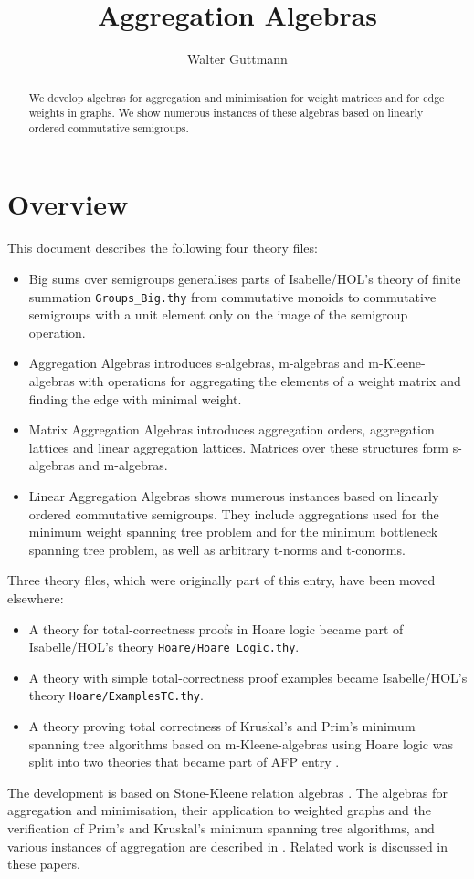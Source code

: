 \documentclass[11pt,a4paper]{article}
\begin{document}
\title{Aggregation Algebras}
\author{Walter Guttmann}
\maketitle

\begin{abstract}
  We develop algebras for aggregation and minimisation for weight matrices and for edge weights in graphs.
  We show numerous instances of these algebras based on linearly ordered commutative semigroups.
\end{abstract}

\tableofcontents

\section{Overview}

This document describes the following four theory files:
\begin{itemize}
\item Big sums over semigroups generalises parts of Isabelle/HOL's theory of finite summation \texttt{Groups\_Big.thy} from commutative monoids to commutative semigroups with a unit element only on the image of the semigroup operation.
\item Aggregation Algebras introduces s-algebras, m-algebras and m-Kleene-algebras with operations for aggregating the elements of a weight matrix and finding the edge with minimal weight.
\item Matrix Aggregation Algebras introduces aggregation orders, aggregation lattices and linear aggregation lattices.
      Matrices over these structures form s-algebras and m-algebras.
\item Linear Aggregation Algebras shows numerous instances based on linearly ordered commutative semigroups.
      They include aggregations used for the minimum weight spanning tree problem and for the minimum bottleneck spanning tree problem, as well as arbitrary t-norms and t-conorms.
\end{itemize}
Three theory files, which were originally part of this entry, have been moved elsewhere:
\begin{itemize}
\item A theory for total-correctness proofs in Hoare logic became part of Isabelle/HOL's theory \texttt{Hoare/Hoare\_Logic.thy}.
\item A theory with simple total-correctness proof examples became Isabelle/HOL's theory \texttt{Hoare/ExamplesTC.thy}.
\item A theory proving total correctness of Kruskal's and Prim's minimum spanning tree algorithms based on m-Kleene-algebras using Hoare logic was split into two theories that became part of AFP entry \cite{GuttmannRobinsonOBrien2020}.
\end{itemize}
The development is based on Stone-Kleene relation algebras \cite{Guttmann2017b,Guttmann2017c}.
The algebras for aggregation and minimisation, their application to weighted graphs and the verification of Prim's and Kruskal's minimum spanning tree algorithms, and various instances of aggregation are described in \cite{Guttmann2016c,Guttmann2018a,Guttmann2018b}.
Related work is discussed in these papers.

\begin{flushleft}

\end{flushleft}



\end{document}
